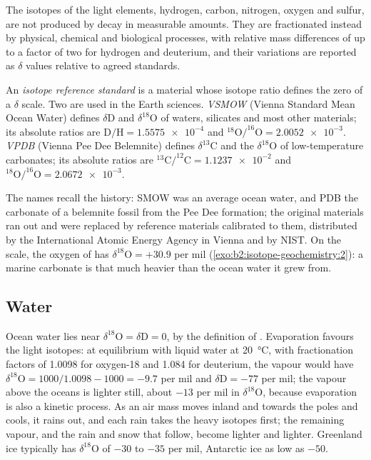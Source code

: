 The isotopes of the light elements, hydrogen, carbon, nitrogen, oxygen and
sulfur, are not produced by decay in measurable amounts. They are fractionated
instead by physical, chemical and biological processes, with relative mass
differences of up to a factor of two for hydrogen and deuterium, and their
variations are reported as $\delta$ values relative to agreed standards.

\begin{definition}\label{def:b2:isotope-geochemistry:standards}
An \emph{isotope reference standard} is a
material whose isotope ratio defines the zero of a $\delta$ scale. Two are used
in the Earth sciences. \emph{VSMOW} (Vienna Standard Mean Ocean
Water) defines $\delta\mathrm{D}$ and $\delta^{18}\mathrm{O}$ of waters, silicates and
most other materials; its absolute ratios are $\mathrm{D}/\mathrm{H} =
\num{1.5575e-4}$ and $^{18}\mathrm{O}/^{16}\mathrm{O} = \num{2.0052e-3}$.
\emph{VPDB} (Vienna Pee Dee Belemnite) defines $\delta^{13}\mathrm{C}$
and the $\delta^{18}\mathrm{O}$ of low-temperature carbonates; its absolute ratios
are $^{13}\mathrm{C}/^{12}\mathrm{C} = \num{1.1237e-2}$ and
$^{18}\mathrm{O}/^{16}\mathrm{O} = \num{2.0672e-3}$.
\end{definition}

The names recall the history: SMOW was an average ocean water, and PDB the
carbonate of a belemnite fossil from the Pee Dee formation; the original
materials ran out and were replaced by reference materials calibrated to them,
distributed by the International Atomic Energy Agency in Vienna and by NIST.
On the  scale, the oxygen of  has $\delta^{18}\mathrm{O} = +30.9$ per mil
(\cref{exo:b2:isotope-geochemistry:2}): a marine carbonate is that much heavier than the ocean water it grew
from.

\subsection{Water}

Ocean water lies near $\delta^{18}\mathrm{O} = \delta\mathrm{D} = 0$, by the
definition of . Evaporation favours the light isotopes: at equilibrium
with liquid water at \qty{20}{\degreeCelsius}, with fractionation factors of
1.0098 for oxygen-18 and 1.084 for deuterium, the vapour would have
$\delta^{18}\mathrm{O} = 1000/1.0098 - 1000 = -9.7$ per mil and $\delta\mathrm{D} =
-77$ per mil; the vapour above the oceans is lighter still, about $-13$ per mil
in $\delta^{18}\mathrm{O}$, because evaporation is also a kinetic process.
As an air mass moves inland and towards the poles and cools, it rains out, and
each rain takes the heavy isotopes first; the remaining vapour, and the rain and
snow that follow, become lighter and lighter. Greenland ice typically has
$\delta^{18}\mathrm{O}$ of $-30$ to $-35$ per mil, Antarctic ice as low as $-50$.

